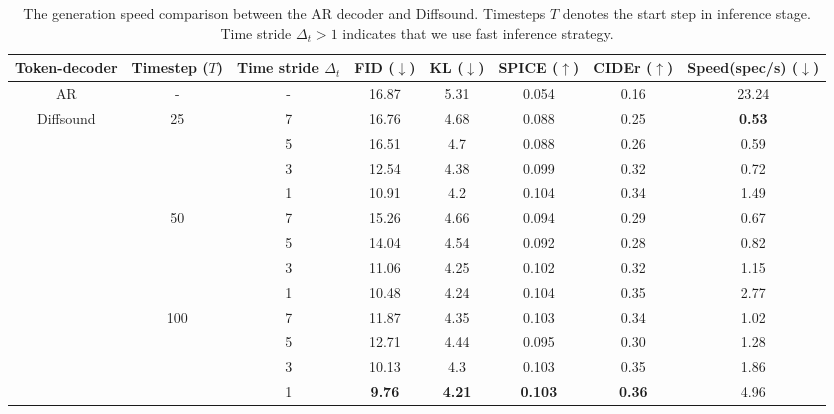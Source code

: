 \documentclass[lettersize,journal]{IEEEtran}
\begin{document}
\begin{table*}[t] \centering
\caption{The generation speed comparison between the AR decoder and Diffsound. Timesteps $T$ denotes the start step in inference stage. Time stride $\Delta_t > 1$ indicates that we use fast inference strategy.}
\label{tab:my-table3}
\begin{tabular}{cccccccc}
\hline
Token-decoder     & Timestep ($T$) & Time stride $\Delta_t$ & FID ($\downarrow$)& KL ($\downarrow$)     & SPICE ($\uparrow$)  & CIDEr ($\uparrow$)  & Speed(spec/s) ($\downarrow$) \\ \hline
AR                                               & -                    & -          & 16.87 & 5.31 & 0.054 & 0.16  & 23.24         \\ \hline
\multicolumn{1}{c|}{\multirow{12}{*}{Diffsound}} & \multirow{4}{*}{25}  & 7         & 16.76 & 4.68 & 0.088 & 0.25  & \textbf{0.53}          \\
\multicolumn{1}{c|}{}                            &                      & 5         & 16.51 & 4.7  & 0.088 & 0.26  & 0.59          \\
\multicolumn{1}{c|}{}                            &                      & 3         & 12.54 & 4.38 & 0.099 & 0.32  & 0.72          \\
\multicolumn{1}{c|}{}                            &                      & 1         & 10.91 & 4.2  & 0.104 & 0.34  & 1.49          \\ \cline{2-8} 
\multicolumn{1}{c|}{}                            & \multirow{4}{*}{50}  & 7         & 15.26 & 4.66 & 0.094 & 0.29  & 0.67          \\
\multicolumn{1}{c|}{}                            &                      & 5         & 14.04 & 4.54 & 0.092 & 0.28  & 0.82          \\
\multicolumn{1}{c|}{}                            &                      & 3         & 11.06 & 4.25 & 0.102 & 0.32  & 1.15          \\
\multicolumn{1}{c|}{}                            &                      & 1         & 10.48 & 4.24 & 0.104 & 0.35  & 2.77          \\ \cline{2-8} 
\multicolumn{1}{c|}{}                            & \multirow{4}{*}{100} & 7         & 11.87 & 4.35 & 0.103 & 0.34  & 1.02          \\
\multicolumn{1}{c|}{}                            &                      & 5         & 12.71 & 4.44 & 0.095 & 0.30  & 1.28          \\
\multicolumn{1}{c|}{}                            &                      & 3         & 10.13 & 4.3  & 0.103 & 0.35  & 1.86          \\
\multicolumn{1}{c|}{}                            &                      & 1         & \textbf{9.76}  & \textbf{4.21} & \textbf{0.103} & \textbf{0.36}  & 4.96          \\ \hline
\end{tabular}
\end{table*}
\end{document}
